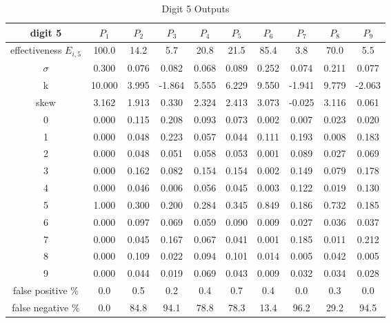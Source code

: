 \documentclass[conference]{IEEEtran}
\begin{document}
\begin{table}
\caption{Digit 5 Outputs}
\centering\begin{tabular}{ | c ||  c | c | c | c | c | c | c | c | c |}
 digit 5 & $P_1$ & $P_2$ & $P_3$ & $P_4$ & $P_5$ & $P_6$ & $P_7$ & $P_8$ & $P_9$ \\
\hline \hline
effectiveness $E_{i,5}$  & 100.0 & 14.2 & 5.7 & 20.8 & 21.5 & 85.4 & 3.8 & 70.0 & 5.5 \\
\hline
$\sigma$ & 0.300& 0.076& 0.082& 0.068& 0.089& 0.252& 0.074& 0.211& 0.077 \\
\hline
k & 10.000& 3.995& -1.864& 5.555& 6.229& 9.550& -1.941& 9.779& -2.063 \\
\hline
skew & 3.162& 1.913& 0.330& 2.324& 2.413& 3.073& -0.025& 3.116& 0.061 \\
\hline
0 & 0.000 & 0.115 & 0.208 & 0.093 & 0.073 & 0.002 & 0.007 & 0.023 & 0.020 \\
\hline
1 & 0.000 & 0.048 & 0.223 & 0.057 & 0.044 & 0.111 & 0.193 & 0.008 & 0.183 \\
\hline
2 & 0.000 & 0.048 & 0.051 & 0.058 & 0.053 & 0.001 & 0.089 & 0.027 & 0.069 \\
\hline
3 & 0.000 & 0.162 & 0.082 & 0.154 & 0.154 & 0.002 & 0.149 & 0.079 & 0.178 \\
\hline
4 & 0.000 & 0.046 & 0.006 & 0.056 & 0.045 & 0.003 & 0.122 & 0.019 & 0.130 \\
\hline
5 & 1.000 & 0.300 & 0.200 & 0.284 & 0.345 & 0.849 & 0.186 & 0.732 & 0.185 \\
\hline
6 & 0.000 & 0.097 & 0.069 & 0.059 & 0.090 & 0.009 & 0.027 & 0.036 & 0.037 \\
\hline
7 & 0.000 & 0.045 & 0.167 & 0.067 & 0.041 & 0.001 & 0.185 & 0.011 & 0.212 \\
\hline
8 & 0.000 & 0.109 & 0.022 & 0.094 & 0.101 & 0.014 & 0.005 & 0.042 & 0.005 \\
\hline
9 & 0.000 & 0.044 & 0.019 & 0.069 & 0.043 & 0.009 & 0.032 & 0.034 & 0.028 \\
\hline
false positive \%  & 0.0 & 0.5 & 0.2 & 0.4 & 0.7 & 0.4 & 0.0 & 0.3 & 0.0 \\
\hline
false negative \%  & 0.0 & 84.8 & 94.1 & 78.8 & 78.3 & 13.4 & 96.2 & 29.2 & 94.5 \\
\hline
\end{tabular}
\label{table:digit5out}
\end{table}
\end{document}
